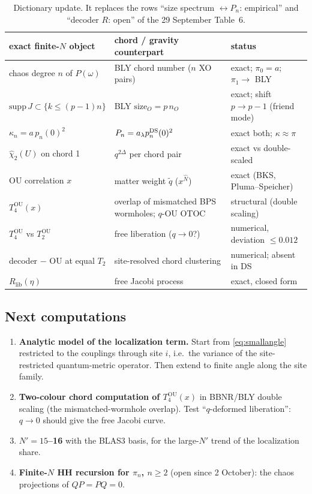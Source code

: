 \documentclass[11pt]{article}
\newcommand{\Np}{N'}
\newcommand{\lib}{\mathrm{lib}}
\newcommand{\OU}{\mathrm{OU}}
\theoremstyle{remark}
\begin{document}
\begin{table}[!htbp]
\centering\small
\begin{tabular}{@{}>{\raggedright\arraybackslash}p{}>{\raggedright\arraybackslash}p{}>{\raggedright\arraybackslash}p{}@{}}
\toprule
exact finite-$N$ object & chord / gravity counterpart & status\\
\midrule
chaos degree $n$ of $P(\omega)$ & BLY chord number ($n$ XO pairs) & exact; $\pi_0=a$; $\pi_1\to$ BLY\\
$\mathrm{supp}\,J\subset\{k\le(p-1)n\}$ & BLY $\mathrm{size}_O=p\,n_O$ & exact; shift $p\to p-1$ (friend mode)\\
$\kappa_n=a\,p_n(0)^2$ & $P_n=a_\lambda p_n^{\rm DS}(0)^2$ & exact both; $\kappa\approx\pi$\\
$\hat\chi_2(U)$ on chord 1 & $q^{2\Delta}$ per chord pair & exact vs double-scaled\\
OU correlation $x$ & matter weight $\tilde q$ ($x^{\hat N}$) & exact (BKS, Pluma--Speicher)\\
$T_4^\OU(x)$ & overlap of mismatched BPS wormholes; $q$-OU OTOC & structural (double scaling)\\
$T_4^\OU$ vs $T_2^\OU$ & free liberation ($q\to0$?) & numerical, deviation $\le0.012$\\
decoder $-$ OU at equal $T_2$ & site-resolved chord clustering & numerical; absent in DS\\
$R_\lib(\eta)$ & free Jacobi process & exact, closed form\\
\bottomrule
\end{tabular}
\caption{Dictionary update. It replaces the rows ``size spectrum $\leftrightarrow P_n$: empirical'' and ``decoder $R$:
open'' of the 29 September Table~6.}
\label{tab:dictionary}
\end{table}

\subsection{Next computations}
\begin{enumerate}\itemsep1pt
\item \textbf{Analytic model of the localization term.} Start from \eqref{eq:smallangle} restricted to the couplings
  through site $i$, i.e.\ the variance of the site-restricted quantum-metric operator. Then extend to finite angle along the
  site family.
\item \textbf{Two-colour chord computation of $T_4^\OU(x)$} in BBNR/BLY double scaling (the mismatched-wormhole overlap).
  Test ``$q$-deformed liberation'': $q\to0$ should give the free Jacobi curve.
\item \textbf{$\Np=15$--16} with the BLAS3 basis, for the large-$\Np$ trend of the localization share.
\item \textbf{Finite-$N$ HH recursion for $\pi_n$, $n\ge2$} (open since 2 October): the chaos projections of
  $QP=PQ=0$.
\end{enumerate}
\end{document}

